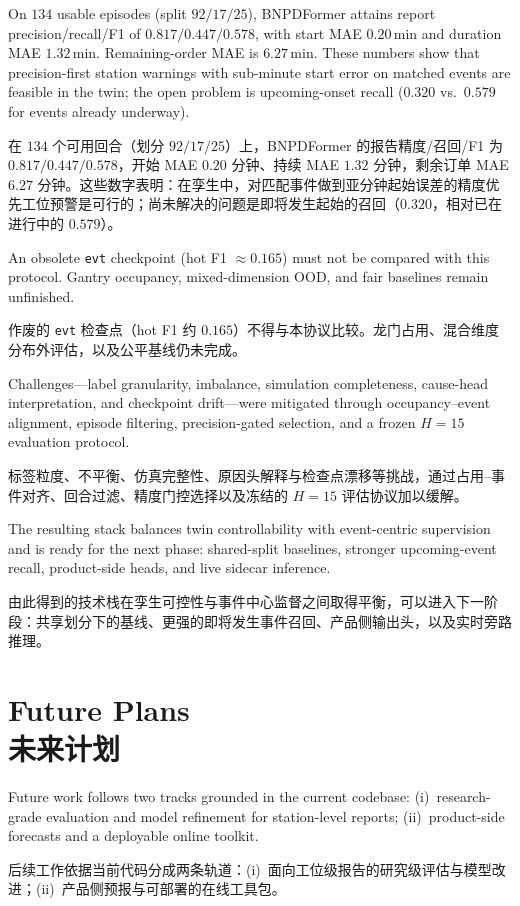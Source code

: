 \documentclass[12pt,a4paper,oneside,scheme=plain]{ctexrep}
\newcommand{\bip}[2]{%
  \par #1\par
  \nobreak\vspace{0.12em}%
  {\small\color{black!62}#2}\par
  \vspace{0.62em}%
}
\begin{document}
\bip
{On $134$ usable episodes (split $92/17/25$), BNPDFormer attains report precision/recall/F1 of $0.817/0.447/0.578$, with start MAE $0.20$\,min and duration MAE $1.32$\,min. Remaining-order MAE is $6.27$\,min. These numbers show that precision-first station warnings with sub-minute start error on matched events are feasible in the twin; the open problem is upcoming-onset recall ($0.320$ vs.\ $0.579$ for events already underway).}
{在 $134$ 个可用回合（划分 $92/17/25$）上，BNPDFormer 的报告精度/召回/F1 为 $0.817/0.447/0.578$，开始 MAE $0.20$ 分钟、持续 MAE $1.32$ 分钟，剩余订单 MAE $6.27$ 分钟。这些数字表明：在孪生中，对匹配事件做到亚分钟起始误差的精度优先工位预警是可行的；尚未解决的问题是即将发生起始的召回（$0.320$，相对已在进行中的 $0.579$）。}

\bip
{An obsolete \texttt{evt} checkpoint (hot F1 $\approx 0.165$) must not be compared with this protocol. Gantry occupancy, mixed-dimension OOD, and fair baselines remain unfinished.}
{作废的 \texttt{evt} 检查点（hot F1 约 $0.165$）不得与本协议比较。龙门占用、混合维度分布外评估，以及公平基线仍未完成。}

\bip
{Challenges---label granularity, imbalance, simulation completeness, cause-head interpretation, and checkpoint drift---were mitigated through occupancy--event alignment, episode filtering, precision-gated selection, and a frozen $H=15$ evaluation protocol.}
{标签粒度、不平衡、仿真完整性、原因头解释与检查点漂移等挑战，通过占用--事件对齐、回合过滤、精度门控选择以及冻结的 $H=15$ 评估协议加以缓解。}

\bip
{The resulting stack balances twin controllability with event-centric supervision and is ready for the next phase: shared-split baselines, stronger upcoming-event recall, product-side heads, and live sidecar inference.}
{由此得到的技术栈在孪生可控性与事件中心监督之间取得平衡，可以进入下一阶段：共享划分下的基线、更强的即将发生事件召回、产品侧输出头，以及实时旁路推理。}

\chapter[Future Plans / 未来计划]{Future Plans\\[0.3em]{\large 未来计划}}
\label{ch:future}

\bip
{Future work follows two tracks grounded in the current codebase: (i)~research-grade evaluation and model refinement for station-level reports; (ii)~product-side forecasts and a deployable online toolkit.}
{后续工作依据当前代码分成两条轨道：(i)~面向工位级报告的研究级评估与模型改进；(ii)~产品侧预报与可部署的在线工具包。}
\end{document}
